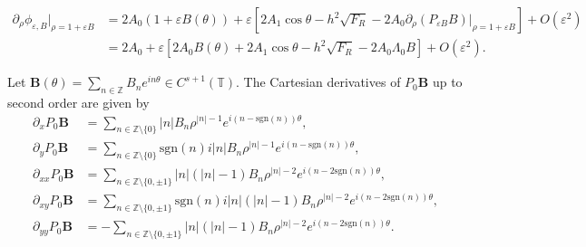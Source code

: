 \documentclass[10pt,a4paper]{amsart}
\begin{document}
\begin{equation}\label{eq:prho-phi}
\begin{split}
\partial_{\rho}\phi_{\varepsilon,B}\big|_{\rho=1+\varepsilon B}&=  2A_0(1+\varepsilon B(\theta))+\varepsilon \left[  2A_1 \cos\theta-  h^2\sqrt{F_R} 
-2 A_0\partial_{\rho}(P_{\varepsilon B}B)|_{\rho=1+\varepsilon B}\right] 
+O(\varepsilon^2) \\
&=2A_0 +\varepsilon \left[ 2A_0 B(\theta)+ 2A_1 \cos\theta-  h^2\sqrt{F_R} 
-2 A_0 \Lambda_{0}B  \right] 
+O(\varepsilon^2).
\end{split}
\end{equation}

\begin{lemma} \label{lem:poisson-calculus}
Let $\textbf{B}(\theta)=\sum_{n\in\mathbb Z}B_ne^{in\theta}\in C^{s+1}(\mathbb T)$.  The Cartesian derivatives of $ P_0\textbf{B} $ up to second order are given by 
\begin{equation}\label{eq:Poisson-derivatives1}
\begin{split}
\partial_xP_0\textbf{B}&=\sum_{n\in\mathbb Z\setminus\{0\}}|n|B_n\rho^{|n|-1}e^{i(n-\text{sgn}(n))\theta},\\
\partial_yP_0\textbf{B}&=\sum_{n\in\mathbb Z\setminus\{0\}}\text{sgn}(n)i|n|B_n\rho^{|n|-1}e^{i(n-\text{sgn}(n))\theta},\\
\partial_{xx}P_0\textbf{B}&=\sum_{n\in\mathbb Z\setminus\{0,\pm1\}}|n|(|n|-1)B_n\rho^{|n|-2}e^{i(n-2\text{sgn}(n))\theta},\\
\partial_{xy}P_0\textbf{B}&=\sum_{n\in\mathbb Z\setminus\{0,\pm1\}}\text{sgn}(n)i|n|(|n|-1)B_n\rho^{|n|-2}e^{i(n-2\text{sgn}(n))\theta},\\
\partial_{yy}P_0\textbf{B}&=-\sum_{n\in\mathbb Z\setminus\{0,\pm1\}}|n|(|n|-1)B_n\rho^{|n|-2}e^{i(n-2\text{sgn}(n))\theta}.
\end{split}
\end{equation}

\end{lemma}
\end{document}
